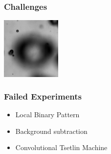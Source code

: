 \documentclass{beamer}
\begin{document}
\begin{frame}
    \frametitle{Challenges}
    \begin{center}
        \includegraphics[width=0.8\columnwidth]{bright-spot}
    \end{center}
\end{frame}

\begin{frame}
    \frametitle{Failed Experiments}

    \begin{itemize}
        \item Local Binary Pattern
        \item Background subtraction
        \item Convolutional Tsetlin Machine
    \end{itemize}

\end{frame}
\end{document}
